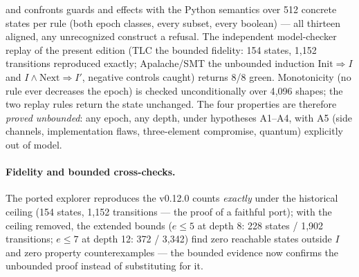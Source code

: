 \documentclass[11pt,a4paper]{article}
\begin{document}
and confronts guards and effects with the Python semantics over 512
concrete states per rule (both epoch classes, every subset, every
boolean) --- all thirteen aligned, any unrecognized construct a refusal.
The independent model-checker replay of the present edition (TLC the
bounded fidelity: 154 states, 1{,}152 transitions reproduced exactly;
Apalache/SMT the unbounded induction
$\mathrm{Init} \Rightarrow I$ and $I \wedge \mathrm{Next} \Rightarrow I'$,
negative controls caught) returns 8/8 green. Monotonicity (no rule ever decreases the epoch)
is checked unconditionally over 4{,}096 shapes; the two replay rules
return the state unchanged. The four properties are therefore
\emph{proved unbounded}: any epoch, any depth, under hypotheses
A1--A4, with A5 (side channels, implementation flaws, three-element
compromise, quantum) explicitly out of model.

\paragraph{Fidelity and bounded cross-checks.} The ported explorer
reproduces the v0.12.0 counts \emph{exactly} under the historical
ceiling (154 states, 1{,}152 transitions --- the proof of a faithful
port); with the ceiling removed, the extended bounds ($e \le 5$ at depth
8: 228 states / 1{,}902 transitions; $e \le 7$ at depth 12: 372 /
3{,}342) find zero reachable states outside $I$ and zero property
counterexamples --- the bounded evidence now confirms the unbounded
proof instead of substituting for it.
\end{document}
